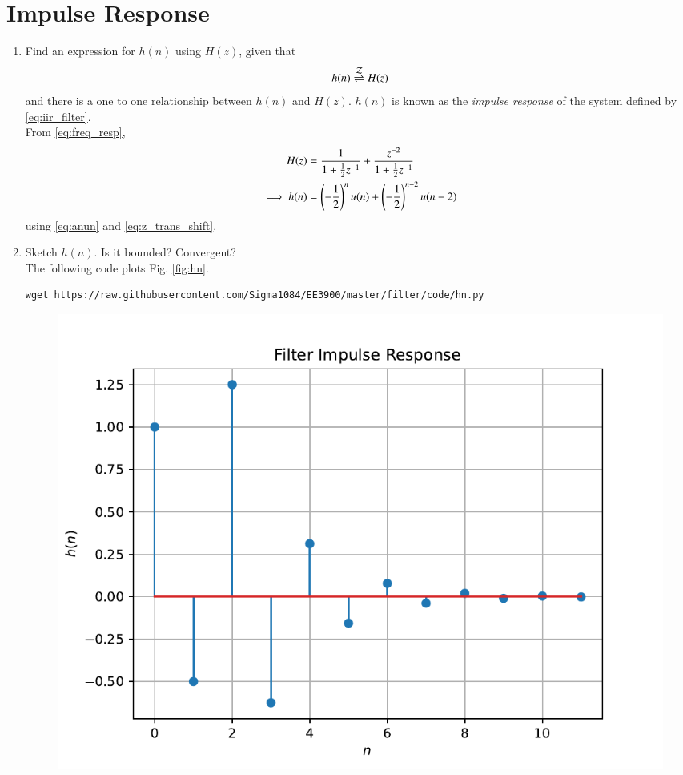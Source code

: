 \documentclass[journal,12pt,twocolumn]{IEEEtran}
\renewcommand\thesection{\arabic{section}}
\begin{document}
\section{Impulse Response}
\begin{enumerate}[label=\thesection.\arabic*]
\item \label{prob:impulse_resp}
Find an expression for $h(n)$ using $H(z)$, given that 
\begin{equation}
\label{eq:impulse_resp}
h(n) \overset{\mathcal{Z}}{ \rightleftharpoons} H(z)
\end{equation}
and there is a one to one relationship between $h(n)$ and $H(z)$. $h(n)$ is known as the {\em impulse response} of the
system defined by \eqref{eq:iir_filter}.
\\
\solution From \eqref{eq:freq_resp},
\begin{align}
H(z) &= \frac{1}{1 + \frac{1}{2}z^{-1}} + \frac{ z^{-2}}{1 + \frac{1}{2}z^{-1}}
\\
\implies h(n) &= \left(-\frac{1}{2}\right)^{n}u(n) + \left(-\frac{1}{2}\right)^{n-2}u(n-2)
\end{align}
using \eqref{eq:anun} and \eqref{eq:z_trans_shift}.
\item Sketch $h(n)$. Is it bounded? Convergent? 
\\
\solution The following code plots Fig. \ref{fig:hn}.
\begin{lstlisting}
wget https://raw.githubusercontent.com/Sigma1084/EE3900/master/filter/code/hn.py
\end{lstlisting}
\begin{figure}[!ht]
\centering
\includegraphics[width=\columnwidth]{./figs/hn}

\end{figure}
\end{enumerate}
\end{document}
